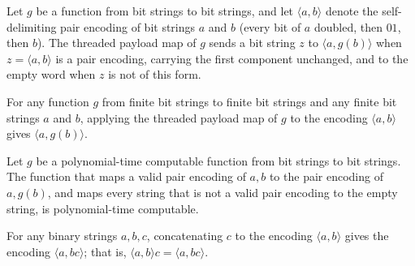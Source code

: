 \begin{definition}
\label{Complexity.pairMapSnd}
\leanok
{}
Let $g$ be a function from bit strings to bit strings, and let $\langle a,b\rangle$ denote the self-delimiting pair encoding of bit strings $a$ and $b$ (every bit of $a$ doubled, then $01$, then $b$). The threaded payload map of $g$ sends a bit string $z$ to $\langle a, g(b)\rangle$ when $z = \langle a,b\rangle$ is a pair encoding, carrying the first component unchanged, and to the empty word when $z$ is not of this form.
\end{definition}

\begin{theorem}
\label{Complexity.pairMapSnd_pairEncode}
\leanok
{}
For any function $g$ from finite bit strings to finite bit strings and any finite bit
strings $a$ and $b$, applying the threaded payload map of $g$ to the encoding $\langle
a,b\rangle$ gives $\langle a,g(b)\rangle$.
\end{theorem}

\begin{theorem}
\label{Complexity.PolyTimeComputable.pairMapSnd}
\leanok
{}
Let $g$ be a polynomial-time computable function from bit strings to bit strings. The
function that maps a valid pair encoding of $a,b$ to the pair encoding of $a,g(b)$, and
maps every string that is not a valid pair encoding to the empty string, is
polynomial-time computable.
\end{theorem}

\begin{lemma}
\label{Complexity.pairEncode_append}
\leanok
{}
For any binary strings $a,b,c$, concatenating $c$ to the encoding $\langle a,b\rangle$
gives the encoding $\langle a,bc\rangle$; that is, $\langle a,b\rangle c=\langle
a,bc\rangle$.
\end{lemma}

